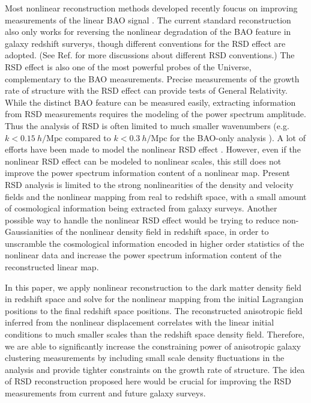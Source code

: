 \documentclass[aps,prx,twocolumn,superscriptaddress,groupedaddress,nofootinbib,amsfont]{revtex4}  %
\newcommand{\mr}{\mathrm}
\begin{document}
Most nonlinear reconstruction methods developed recently foucus on improving 
measurements of the linear BAO signal \cite{2016HMZ,2017Marcel,2017Shi,2017US}.
The current standard reconstruction also only works for reversing the nonlinear
degradation of the BAO feature in galaxy redshift surverys, though different
conventions for the RSD effect are adopted. (See Ref. \cite{2016Seo} for more
discussions about different RSD conventions.) 
The RSD effect is also one of the most powerful probes of the Universe, 
complementary to the BAO measurements. Precise measurements of the growth rate
of structure with the RSD effect can provide tests of General Relativity. 
While the distinct BAO feature can be measured easily, extracting information
from RSD measurements requires the modeling of the power spectrum amplitude.
Thus the analysis of RSD is often limited to much smaller wavenumbers
(e.g. $k<0.15\ h/\mr{Mpc}$ compared to $k<0.3\ h/\mr{Mpc}$ for the BAO-only
analysis \cite{2017F,2017F2}).
A lot of efforts have been made to model the nonlinear RSD effect \cite{1995F,1998H,2001W,2001S,2002K,2004S,2006T,2007T,2010D,2010TNS,2011M,2011O,2011O2,2011S,2011J,2011GSM,2011DF,2012O,2012O2,2012K,2013Z,2013Z2,2014I,2015W,2015B,2016B,2016J,2017H}.
However, even if the nonlinear RSD effect can be modeled to nonlinear scales,
this still does not improve the power spectrum information content of a 
nonlinear map.
Present RSD analysis is limited to the strong nonlinearities of the density 
and velocity fields and the nonlinear mapping from real to redshift space, with
a small amount of cosmological information being extracted from galaxy surveys.
Another possible way to handle the nonlinear RSD effect would be trying to 
reduce non-Gaussianities of the nonlinear density field in redshift space,
in order to unscramble the cosmological information encoded in higher order 
statistics of the nonlinear data and increase the power spectrum information 
content of the reconstructed linear map.

In this paper, we apply nonlinear reconstruction to the dark matter density 
field in redshift space and solve for the nonlinear mapping from the initial 
Lagrangian positions to the final redshift space positions.
The reconstructed anisotropic field inferred from the nonlinear 
displacement correlates with the linear initial conditions to much smaller
scales than the redshift space density field.
Therefore, we are able to significantly increase the constraining power of 
anisotropic galaxy clustering measurements by including small scale density
fluctuations in the analysis and provide tighter constraints
on the growth rate of structure.
The idea of RSD reconstruction proposed here would be crucial for improving
the RSD measurements from current and future galaxy surveys.
\end{document}
